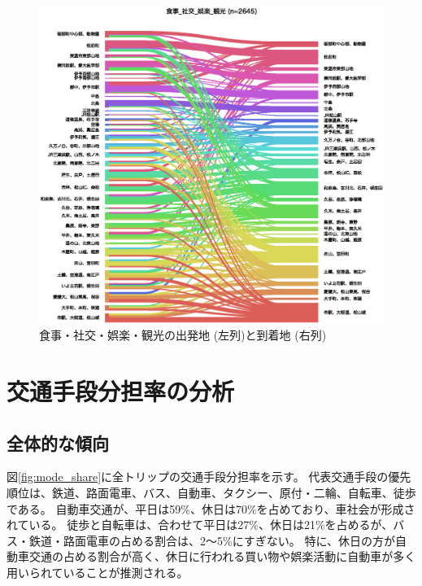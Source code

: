 \documentclass[a4paper,12pt, uplatex]{jsbook}
\begin{document}
\begin{figure}[htbp]
    \centering
    \includegraphics[width=1.0\textwidth]{picture/connection_食事_社交_娯楽_観光.eps}
    \caption{食事・社交・娯楽・観光の出発地 (左列)と到着地 (右列)}
    \label{fig:od_leisure}
\end{figure}




\clearpage
\section{交通手段分担率の分析}
\subsection{全体的な傾向}
図\ref{fig:mode_share}に全トリップの交通手段分担率を示す。
代表交通手段の優先順位は、鉄道、路面電車、バス、自動車、タクシー、原付・二輪、自転車、徒歩である。
自動車交通が、平日は59\%、休日は70\%を占めており、車社会が形成されている。
徒歩と自転車は、合わせて平日は27\%、休日は21\%を占めるが、バス・鉄道・路面電車の占める割合は、2〜5\%にすぎない。
特に、休日の方が自動車交通の占める割合が高く、休日に行われる買い物や娯楽活動に自動車が多く用いられていることが推測される。
\end{document}
